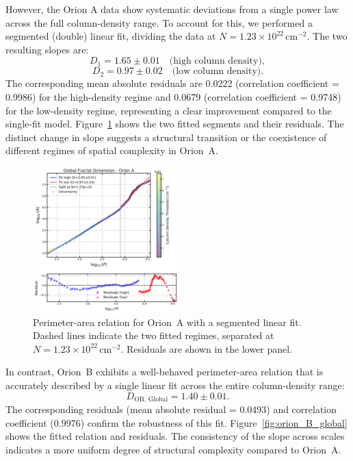 However, the Orion A data show systematic deviations from a single power law across the full column-density range. To account for this, we performed a segmented (double) linear fit, dividing the data at \(N = 1.23 \times 10^{22}\,\mathrm{cm}^{-2}\). The two resulting slopes are:
\[
D_1 = 1.65 \pm 0.01 \quad \text{(high column density)},
\]
\[
D_2 = 0.97 \pm 0.02 \quad \text{(low column density)}.
\]
The corresponding mean absolute residuals are 0.0222 (correlation coefficient = 0.9986) for the high-density regime and 0.0679 (correlation coefficient = 0.9748) for the low-density regime, representing a clear improvement compared to the single-fit model.  
Figure~\ref{fig:orion_A_global_double_fit} shows the two fitted segments and their residuals. The distinct change in slope suggests a structural transition or the coexistence of different regimes of spatial complexity in Orion~A.

\begin{figure}[t]
    \centering
    \includegraphics[width=0.5\textwidth]{figures/orion_A_global_double_fit.png}
    \caption{Perimeter-area relation for Orion~A with a segmented linear fit. Dashed lines indicate the two fitted regimes, separated at \(N = 1.23 \times 10^{22}\,\mathrm{cm}^{-2}\). Residuals are shown in the lower panel.}
    \label{fig:orion_A_global_double_fit}
\end{figure}

In contrast, Orion~B exhibits a well-behaved perimeter-area relation that is accurately described by a single linear fit across the entire column-density range:
\[
D_{\mathrm{OB,\,Global}} = 1.40 \pm 0.01 .
\]
The corresponding residuals (mean absolute residual = 0.0493) and correlation coefficient (0.9976) confirm the robustness of this fit. Figure~\ref{fig:orion_B_global} shows the fitted relation and residuals. The consistency of the slope across scales indicates a more uniform degree of structural complexity compared to Orion~A.

